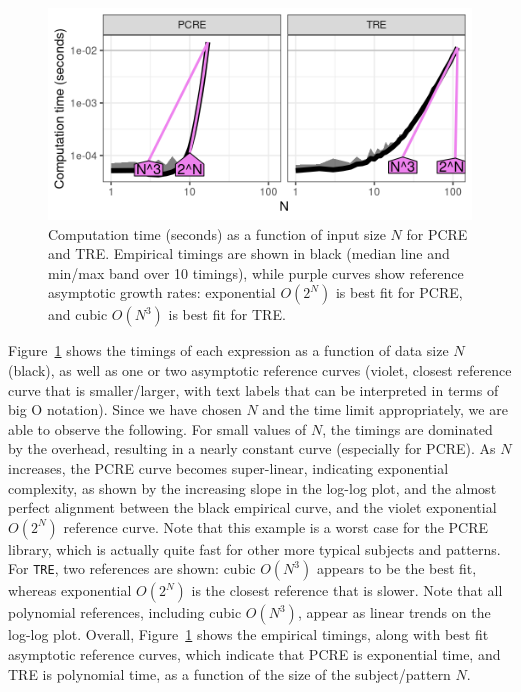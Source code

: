 \begin{figure}[t]
    \centering
    \includegraphics[width=0.9\linewidth]{create_subject_pattern_best.png}
    \caption{Computation time (seconds) as a function of input size $N$ for PCRE and TRE. 
    Empirical timings are shown in black (median line and min/max band over 10 timings), while purple curves show reference asymptotic growth rates: exponential $O(2^N)$ is best fit for PCRE, and cubic $O(N^3)$ is best fit for TRE.}
    \label{fig:plot-best-list-PCRE-TRE}
\end{figure}

Figure~\ref{fig:plot-best-list-PCRE-TRE} shows the timings of each expression as a function of data size $N$ (black), as well as one or two asymptotic reference curves (violet, closest reference curve that is smaller/larger, with text labels that can be interpreted in terms of big O notation).
Since we have chosen $N$ and the time limit appropriately, we are able to observe the following.
For small values of $N$, the timings are dominated by the overhead, resulting in a nearly constant curve (especially for PCRE). 
As $N$ increases, the PCRE curve becomes super-linear, indicating exponential complexity, as shown by the increasing slope in the log-log plot, and the almost perfect alignment between the black empirical curve, and the violet exponential $O(2^N)$ reference curve.
Note that this example is a worst case for the PCRE library, which is actually quite fast for other more typical subjects and patterns.
For \texttt{TRE}, two references are shown: cubic $O(N^3)$ appears to be the best fit, whereas exponential $O(2^N)$ is the closest reference that is slower.
Note that all polynomial references, including cubic $O(N^3)$, appear as linear trends on the log-log plot.
Overall, Figure~\ref{fig:plot-best-list-PCRE-TRE} shows the empirical timings, along with best fit asymptotic reference curves, which indicate that PCRE is exponential time, and TRE is polynomial time, as a function of the size of the subject/pattern $N$.



